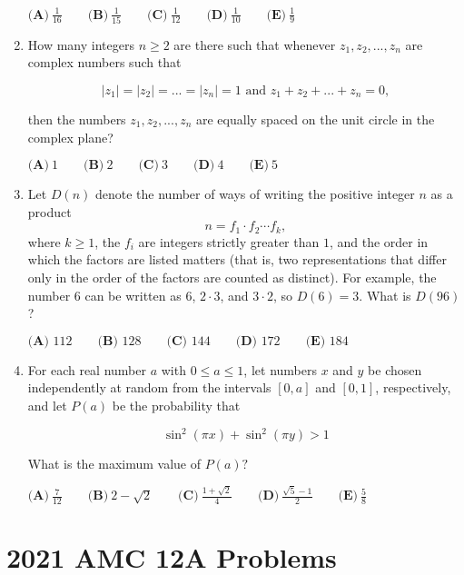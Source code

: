 \documentclass{article}
\begin{document}
\begin{enumerate}[label=\arabic*., itemsep=0.5em]
\(\textbf{(A)}\ \frac{1}{16} \qquad\textbf{(B)}\ \frac{1}{15} \qquad\textbf{(C)}\ \frac{1}{12} \qquad\textbf{(D)}\ \frac{1}{10} \qquad\textbf{(E)}\ \frac{1}{9}\)\par \vspace{0.5em}\item How many integers \(n \geq 2\) are there such that whenever \(z_1, z_2, ..., z_n\) are complex numbers such that


\begin{equation*}
|z_1| = |z_2| = ... = |z_n| = 1 \text{    and    } z_1 + z_2 + ... + z_n = 0,
\end{equation*}

then the numbers \(z_1, z_2, ..., z_n\) are equally spaced on the unit circle in the complex plane?

\(\textbf{(A)}\ 1 \qquad\textbf{(B)}\ 2 \qquad\textbf{(C)}\ 3 \qquad\textbf{(D)}\ 4 \qquad\textbf{(E)}\ 5\)\par \vspace{0.5em}\item Let \(D(n)\) denote the number of ways of writing the positive integer \(n\) as a product
\begin{equation*}
n = f_1\cdot f_2\cdots f_k,
\end{equation*}
where \(k\ge1\), the \(f_i\) are integers strictly greater than \(1\), and the order in which the factors are listed matters (that is, two representations that differ only in the order of the factors are counted as distinct). For example, the number \(6\) can be written as \(6\), \(2\cdot 3\), and \(3\cdot2\), so \(D(6) = 3\). What is \(D(96)\)?

\(\textbf{(A) } 112 \qquad\textbf{(B) } 128 \qquad\textbf{(C) } 144 \qquad\textbf{(D) } 172 \qquad\textbf{(E) } 184\)\par \vspace{0.5em}\item For each real number \(a\) with \(0 \leq a \leq 1\), let numbers \(x\) and \(y\) be chosen independently at random from the intervals \([0, a]\) and \([0, 1]\), respectively, and let \(P(a)\) be the probability that


\begin{equation*}
\sin^2{(\pi x)} + \sin^2{(\pi y)} > 1
\end{equation*}

What is the maximum value of \(P(a)?\)

\(\textbf{(A)}\ \frac{7}{12} \qquad\textbf{(B)}\ 2 - \sqrt{2} \qquad\textbf{(C)}\ \frac{1+\sqrt{2}}{4} \qquad\textbf{(D)}\ \frac{\sqrt{5}-1}{2} \qquad\textbf{(E)}\ \frac{5}{8}\)\par \vspace{0.5em}
\end{enumerate}
\newpage\section*{2021 AMC 12A Problems}
\end{document}
